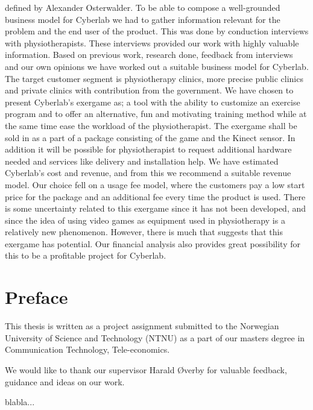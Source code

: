 \documentclass[b5paper,twoside,openright,11pt]{report}
\begin{document}
defined by Alexander Osterwalder. To be able to compose a well-grounded business model for Cyberlab we had to gather information relevant for the problem and the end user of the product. This was done by conduction interviews with physiotherapists. These interviews provided our work with highly valuable information. Based on previous work, research done, feedback from interviews and our own opinions we have worked out a suitable business model for Cyberlab. The target customer segment is physiotherapy clinics, more precise public clinics and private clinics with contribution from the government. We have chosen to present Cyberlab’s exergame as; a tool with the ability to customize an exercise program and to offer an alternative, fun and motivating training method while at the same time ease the workload of the physiotherapist. The exergame shall be sold in as a part of a package consisting of the game and the Kinect sensor. In addition it will be possible for physiotherapist to request additional hardware needed and services like delivery and installation help. We have estimated Cyberlab’s cost and revenue, and from this we recommend a suitable revenue model. Our choice fell on a usage fee model, where the customers pay a low start price for the package and an additional fee every time the product is used. There is some uncertainty related to this exergame since it has not been developed, and since the idea of using video games as equipment used in physiotherapy is a relatively new phenomenon.  However, there is much that suggests that this exergame has potential. Our financial analysis also provides great possibility for this to be a profitable project for Cyberlab.  
\cleardoublepage
\chapter*{Preface}
This thesis is written as a project assignment submitted to the Norwegian University of Science and Technology (NTNU) as a part of our masters degree in Communication Technology, Tele-economics.  

We would like to thank our supervisor Harald Øverby for valuable feedback, guidance and ideas on our work.     

blabla...
\cleardoublepage
{}
\tableofcontents
\cleardoublepage

\cleardoublepage
\listoffigures
\cleardoublepage
\listoftables
\cleardoublepage
{}

\cleardoublepage

\cleardoublepage

\cleardoublepage

\cleardoublepage

\cleardoublepage

\cleardoublepage

\cleardoublepage

\cleardoublepage

\cleardoublepage

\cleardoublepage


\cleardoublepage

\end{document}

